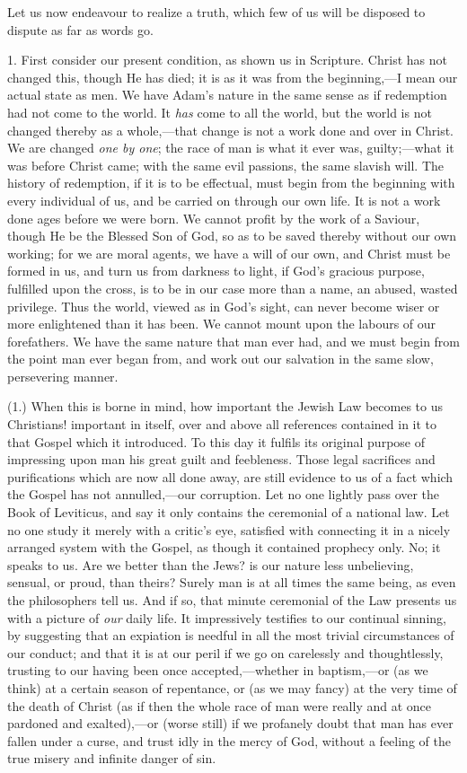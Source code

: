 Let us now endeavour to realize a truth, which few of
us will be disposed to dispute as far as words go.

1. First consider our present condition, as shown us
in Scripture. Christ has not changed this, though He has
died; it is as it was from the beginning,—I mean our
actual state as men. We have Adam's nature in the same
sense as if redemption had not come to the world. It \emph{has}
come to all the world, but the world is not changed
thereby as a whole,—that change is not a work done
and over in Christ. We are changed \emph{one by one}; the
race of man is what it ever was, guilty;—what it was
before Christ came; with the same evil passions, the same
slavish will. The history of redemption, if it is to be
effectual, must begin from the beginning with every
individual of us, and be carried on through our own life.
It is not a work done ages before we were born. We cannot
profit by the work of a Saviour, though He be the Blessed
Son of God, so as to be saved thereby without our own
working; for we are moral agents, we have a will of our
own, and Christ must be formed in us, and turn us from
darkness to light, if God's gracious purpose, fulfilled
upon the cross, is to be in our case more than a name, an
abused, wasted privilege. Thus the world, viewed as in
God's sight, can never become wiser or more enlightened
than it has been. We cannot mount upon the labours of our
forefathers. We have the same nature that man ever had,
and we must begin from the point man ever began from, and
work out our salvation in the same slow, persevering
manner.

(1.) When this is borne in mind, how important the
Jewish Law becomes to us Christians! important in itself,
over and above all references contained in it to that
Gospel which it introduced. To this day it fulfils its
original purpose of impressing upon man his great guilt
and feebleness. Those legal sacrifices and purifications
which are now all done away, are still evidence to us of
a fact which the Gospel has not annulled,—our
corruption. Let no one lightly pass over the Book of
Leviticus, and say it only contains the ceremonial of a
national law. Let no one study it merely with a critic's
eye, satisfied with connecting it in a nicely arranged
system with the Gospel, as though it contained prophecy
only. No; it speaks to us. Are we better than the Jews?
is our nature less unbelieving, sensual, or proud, than
theirs? Surely man is at all times the same being, as
even the philosophers tell us. And if so, that minute
ceremonial of the Law presents us with a picture of \emph{our}
daily life. It impressively testifies to our continual
sinning, by suggesting that an expiation is needful in
all the most trivial circumstances of our conduct; and
that it is at our peril if we go on carelessly and
thoughtlessly, trusting to our having been once
accepted,—whether in baptism,—or (as we think)
at a certain season of repentance, or (as we may fancy)
at the very time of the death of Christ (as if then the
whole race of man were really and at once pardoned and
exalted),—or (worse still) if we profanely doubt
that man has ever fallen under a curse, and trust idly in
the mercy of God, without a feeling of the true misery
and infinite danger of sin.

